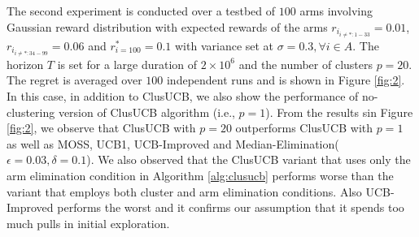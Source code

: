 	The second experiment is conducted over a testbed of $100$ arms involving Gaussian reward distribution with expected rewards of the arms $r_{i_{{i}\neq {*}:1-33}}=0.01$, $r_{i_{{i}\neq {*}:34-99}}=0.06$ and $r^{*}_{i=100}=0.1$ with variance set at $\sigma = 0.3,\forall i\in A$. The horizon $T$ is set for a large duration of $2\times 10^{6}$ and the number of clusters $p=20$. The regret is averaged over $100$ independent runs and is shown in Figure \ref{fig:2}. In this case, in addition to ClusUCB, we also show the performance of no-clustering version of ClusUCB algorithm (i.e., $p=1$).   From the results sin Figure \ref{fig:2}, we observe that ClusUCB with $p=20$ outperforms ClusUCB with $p=1$ as well as MOSS, UCB1, UCB-Improved and Median-Elimination($\epsilon=0.03,\delta=0.1$). We also observed that the ClusUCB variant that uses only  the arm elimination condition in Algorithm \ref{alg:clusucb} performs worse than the variant that employs both cluster and arm elimination conditions. Also UCB-
Improved performs the worst and it confirms our assumption that it spends too much pulls in initial exploration.

